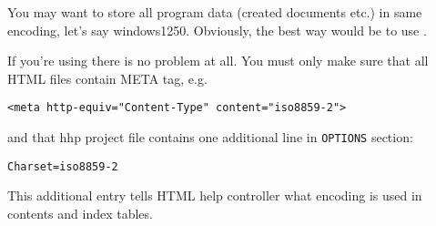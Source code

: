 
You may want to store all program data (created documents etc.) in
same encoding, let's say windows1250. Obviously, the best way would
be to use .


If you're using  there is
no problem at all. You must only make sure that all HTML files contain
META tag, e.g.

\begin{verbatim}
<meta http-equiv="Content-Type" content="iso8859-2">
\end{verbatim}

and that hhp project file contains one additional line in {\tt OPTIONS}
section:

\begin{verbatim}
Charset=iso8859-2
\end{verbatim}

This additional entry tells HTML help controller what encoding is used
in contents and index tables.

